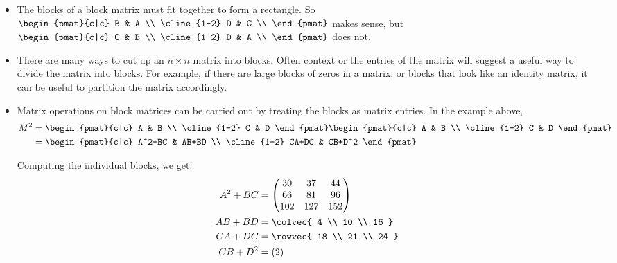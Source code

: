 \begin{itemize}
\item The blocks of a block matrix  must fit together to form a rectangle.  So 
$\begin{pmat}{c|c}
B & A \\
\cline{1-2}
D & C \\
\end{pmat}
$ makes sense, but 
$\begin{pmat}{c|c}
C & B \\
\cline{1-2}
D & A \\
\end{pmat}
$ does not.


\item There are many ways to cut up an $n\times n$ matrix into blocks.  Often context or the entries of the matrix will suggest a useful way to divide the matrix into blocks.  For example, if there are large blocks of zeros in a matrix, or blocks that look like an identity matrix, it can be useful to partition the matrix accordingly.

\item Matrix operations on block matrices can be carried out by treating the blocks as matrix entries.  In the example above,
\begin{align*}
M^2 & = \begin{pmat}{c|c}
A & B \\
\cline{1-2}
C & D 
\end{pmat}
\begin{pmat}{c|c}
A & B \\
\cline{1-2}
C & D 
\end{pmat} \\
& = \begin{pmat}{c|c}
A^2+BC & AB+BD \\
\cline{1-2}
CA+DC & CB+D^2
\end{pmat} 
\end{align*}

Computing the individual blocks, we get:
\begin{align*}
A^2+BC &= \begin{pmatrix}
	30 & 37 & 44 \\
	66 & 81 & 96 \\
	102&127 &152 
	\end{pmatrix} \\
AB+BD  &=\colvec{ 4 \\ 10 \\ 16 } \\
CA+DC  &=\rowvec{ 18 \\ 21 \\ 24 } \\
CB+D^2 &=(2) 
\end{align*}


\end{itemize}
